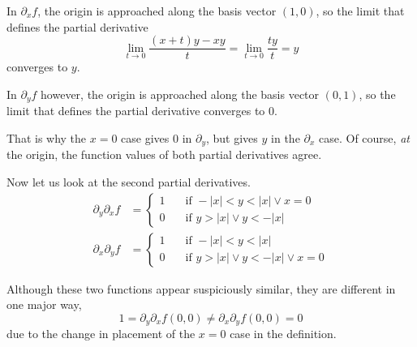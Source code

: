 \documentclass[letterpaper,11pt]{article}
\begin{document}
\begin{enumerate}
\begin{enumerate}
                In $\partial_x f$, the origin is approached along the basis
                vector $(1, 0)$, so the limit that defines the partial
                derivative
                \begin{equation*}
                    \lim_{t \to 0} \frac{(x + t)y - xy}{t}
                    = \lim_{t \to 0} \frac{ty}{t}
                    = y
                \end{equation*}
                converges to $y$.

                In $\partial_y f$ however, the origin is approached along the
                basis vector $(0, 1)$, so the limit that defines the partial
                derivative converges to $0$.

                That is why the $x = 0$ case gives $0$ in $\partial_y$, but
                gives $y$ in the $\partial_x$ case. Of course, \emph{at} the
                origin, the function values of both partial derivatives agree.

                Now let us look at the second partial derivatives.
                \begin{align*}
                    \partial_y \partial_x f &= \begin{cases}
                        1 &\quad\text{if }
                            -|x| < y < |x| \lor x = 0\\
                        0 &\quad\text{if }
                            y > |x| \lor y < -|x|
                    \end{cases} \\
                    \partial_x \partial_y f &= \begin{cases}
                        1 &\quad\text{if }
                            -|x| < y < |x| \\
                        0 &\quad\text{if }
                            y > |x| \lor y < -|x| \lor x = 0
                    \end{cases}
                \end{align*}

                Although these two functions appear suspiciously similar, they
                are different in one major way,
                \begin{equation*}
                    1 = \partial_y \partial_x f(0, 0)
                    \neq
                    \partial_x \partial_y f(0, 0) = 0
                \end{equation*}
                due to the change in placement of the $x = 0$ case in the
                definition.


\end{enumerate}
\end{enumerate}
\end{document}
